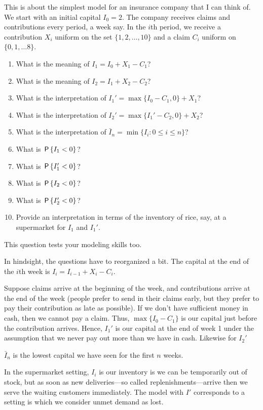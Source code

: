 \documentclass[assignments]{subfiles}
\begin{document}
\begin{exercise}
This is about the simplest model for an insurance company that I can think of.
We start with an initial capital $I_0=2$.
The company receives claims and contributions every period, a week say.
In the $i$th period, we receive a contribution $X_{i}$ uniform on the set $\{1, 2,\ldots,10\}$ and a claim $C_i$ uniform on $\{0, 1, \ldots 8\}$.
\begin{enumerate}
\item What is the meaning of $I_1=I_0+X_1-C_1$?
\item What is the meaning of $I_2=I_1+X_2-C_2$?
\item What is the interpretation of $I_1'=\max\{I_0-C_1,0\} + X_1$?
\item What is the interpretation of $I_2'=\max\{I_1'-C_2,0\} + X_2$?
\item What is the interpretation of $\bar I_{n} = \min\{I_{i} : 0\leq i\leq n\}$?
\item What is  $\P{I_1 < 0}$?
\item What is  $\P{I_1' < 0}$?
\item What is  $\P{I_2 < 0}$?
\item What is  $\P{I_2' < 0}$?
\item Provide an interpretation in terms of the inventory of rice, say, at a supermarket for $I_{1}$ and $I_{1}'$.
\end{enumerate}
\begin{solution}
This question tests your modeling skills too.

In hindsight, the questions have to reorganized a bit.
The capital at the end of the $i$th week is $I_{i} = I_{i-1} + X_{i} - C_{i}$.

Suppose claims arrive at the beginning of the week, and contributions arrive at the end of the week (people prefer to send in their claims early, but they prefer to pay their contribution as late as possible).
If we don't have sufficient money in cash, then we cannot pay a claim.
Thus, $\max\{I_{0}-C_{1}\}$ is our capital just before the contribution arrives. Hence, $I_{1}'$ is our capital at the end of week 1 under the assumption that we never pay out more than we have in cash. Likewise for $I_{2}'$

$\bar I_{n}$ is the lowest capital we have seen for the first $n$ weeks.

In the supermarket setting, $I_{i}$ is our inventory is we can be temporarily out of stock, but as soon as new deliveries---so called replenishments---arrive then we serve the waiting customers immediately.
The model with $I'$ corresponds to a setting is which we consider unmet demand as lost.


\end{solution}
\end{exercise}
\end{document}

